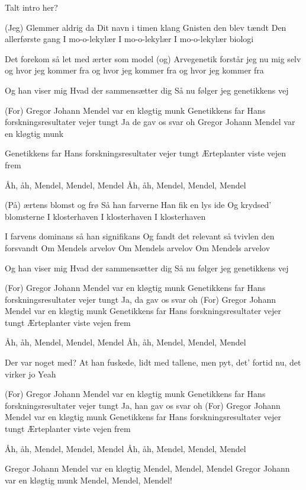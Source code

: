\documentclass[a4paper,11pt]{article}
\begin{document}
\begin{song}
\scene Talt intro her?

(Jeg) Glemmer aldrig da 
Dit navn i timen klang
Gnisten den blev tændt
Den allerførste gang
I mo-o-lekylær
I mo-o-lekylær
I mo-o-lekylær biologi

Det forekom så let
med ærter som model
(og) Arvegenetik
forstår jeg nu mig selv
og hvor jeg kommer fra
og hvor jeg kommer fra
og hvor jeg kommer fra

Og han viser mig
Hvad der sammensætter dig
Så nu følger jeg genetikkens vej

(For) Gregor Johann Mendel var en kløgtig munk
Genetikkens far
Hans forskningsresultater vejer tungt 
Ja de gav os svar oh 
Gregor Johann Mendel var en kløgtig munk 

Genetikkens far
Hans forskningsresultater vejer tungt 
Ærteplanter viste vejen frem

Åh, åh, Mendel, Mendel, Mendel
Åh, åh, Mendel, Mendel, Mendel

(På) ærtens blomst og frø
Så han farverne
Han fik en lys ide 
Og krydsed' blomsterne
I klosterhaven
I klosterhaven
I klosterhaven


I farvens dominans
så han signifikans 
Og fandt det relevant
så tvivlen den forsvandt
Om Mendels arvelov
Om Mendels arvelov 
Om Mendels arvelov 

Og han viser mig
Hvad der sammensætter dig
Så nu følger jeg genetikkens vej

(For) Gregor Johann Mendel var en kløgtig munk 
Genetikkens far 
Hans forskningsresultater vejer tungt
Ja, da gav os svar oh
(For) Gregor Johann Mendel var en kløgtig munk 
Genetikkens far 
Hans forskningsresultater vejer tungt 
Ærteplanter viste vejen frem

Åh, åh, Mendel, Mendel, Mendel
Åh, åh, Mendel, Mendel, Mendel


Der var noget med? At han fuskede,
lidt med tallene, men pyt, det' fortid nu,
det virker jo
Yeah

(For) Gregor Johann Mendel var en kløgtig munk
Genetikkens far 
Hans forskningsresultater vejer tungt 
Ja, han gav os svar oh
(For) Gregor Johann Mendel var en kløgtig munk 
Genetikkens far 
Hans forskningsresultater vejer tungt 
Ærteplanter viste vejen frem

Åh, åh, Mendel, Mendel, Mendel
Åh, åh, Mendel, Mendel, Mendel


Gregor Johann Mendel var en kløgtig 
Mendel, Mendel, Mendel 
Gregor Johann var en kløgtig munk 
Mendel, Mendel, Mendel! 

\end{song}
\end{document}
